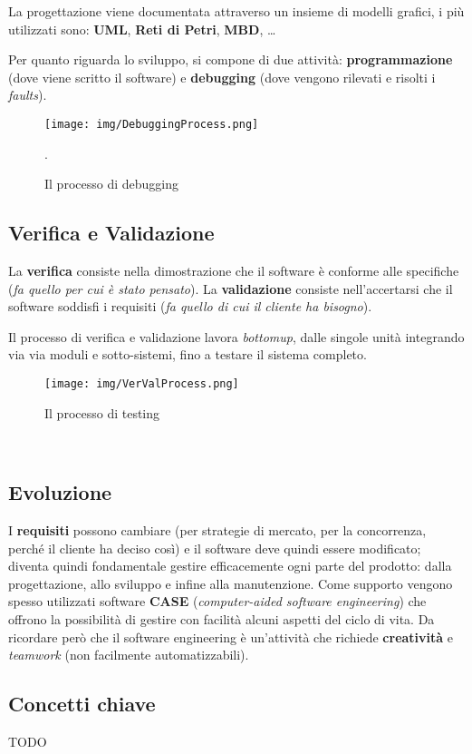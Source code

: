La progettazione viene documentata attraverso un insieme di modelli
grafici, i pi\`u utilizzati sono: \textbf{UML}, \textbf{Reti di Petri},
\textbf{MBD}, \dots

Per quanto riguarda lo sviluppo, si compone di due attivit\`a:
\textbf{programmazione} (dove viene scritto il software)
e \textbf{debugging} (dove vengono rilevati e risolti i \textit{faults}).

\begin{figure}[H]
    \centering
    \texttt{[image: img/DebuggingProcess.png]}
    \caption*{Il processo di debugging}.
\end{figure}

\subsection{Verifica e Validazione}
La \textbf{verifica} consiste nella dimostrazione che il software
\`e conforme alle specifiche (\textit{fa quello per cui \`e stato
pensato}). La \textbf{validazione} consiste nell'accertarsi che
il software soddisfi i requisiti (\textit{fa quello di cui il cliente
ha bisogno}).

Il processo di verifica e validazione lavora \textit{bottomup},
dalle singole unit\`a integrando via via moduli e sotto-sistemi,
fino a testare il sistema completo.

\begin{figure}[H]
    \centering
    \texttt{[image: img/VerValProcess.png]}
    \caption*{Il processo di testing}
\end{figure}

\ \\
\subsection{Evoluzione}
I \textbf{requisiti} possono cambiare (per strategie di mercato,
per la concorrenza, perch\'e il cliente ha deciso cos\`i) e
il software deve quindi essere modificato; diventa quindi fondamentale
gestire efficacemente ogni parte del prodotto: dalla progettazione,
allo sviluppo e infine alla manutenzione. Come supporto vengono
spesso utilizzati software \textbf{CASE} (\textit{computer-aided
software engineering}) che offrono la possibilit\`a di gestire
con facilit\`a alcuni aspetti del ciclo di vita. Da ricordare per\`o
che il software engineering \`e un'attivit\`a che richiede
\textbf{creativit\`a} e \textit{teamwork} (non facilmente automatizzabili).

\subsection{Concetti chiave}

TODO